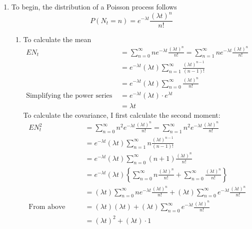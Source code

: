 \documentclass[12pt]{article}
\theoremstyle{plain}
\theoremstyle{definition}
\theoremstyle{remark}
\begin{document}
\begin{enumerate}
  \item %
    To begin, the distribution of a Poisson process follows
    \begin{equation}
      P(N_t = n) = e^{-\lambda t} \frac{(\lambda t)^n}{n!}
    \end{equation}
    \begin{enumerate}
      \item %
        To calculate the mean
        \begin{align*}
          EN_t &=
            \sum^\infty_{n=0} n e^{-\lambda t} \frac{(\lambda t)^n}{n!}
            =\sum^\infty_{n=1} n e^{-\lambda t} \frac{(\lambda t)^n}{n!}\\
          &=e^{-\lambda t} (\lambda t) \sum^\infty_{n=1}
          \frac{(\lambda t)^{n-1}}{(n-1)!}\\
          &=e^{-\lambda t} (\lambda t) \sum^\infty_{n=0}
            \frac{(\lambda t)^{n}}{n!}\\
          \text{Simplifying the power series} \qquad
          &=e^{-\lambda t} (\lambda t) \cdot e^{\lambda t}\\
          &=\lambda t
        \end{align*}
        To calculate the covariance, I first calculate the second
        moment:
        \begin{align*}
          EN_t^2 &=
            \sum^\infty_{n=0} n^2 e^{-\lambda t} \frac{(\lambda t)^n}{n!}
            =\sum^\infty_{n=1} n^2 e^{-\lambda t} \frac{(\lambda t)^n}{n!}\\
          &=e^{-\lambda t} (\lambda t) \sum^\infty_{n=1} n
          \frac{(\lambda t)^{n-1}}{(n-1)!}\\
          &=e^{-\lambda t} (\lambda t) \sum^\infty_{n=0} (n+1)
            \frac{(\lambda t)^{n}}{n!}\\
          &=e^{-\lambda t} (\lambda t) \left\{\sum^\infty_{n=0} n
            \frac{(\lambda t)^{n}}{n!} + \sum^\infty_{n=0}
            \frac{(\lambda t)^{n}}{n!}\right\}\\
          &=(\lambda t) \sum^\infty_{n=0} ne^{-\lambda t}
            \frac{(\lambda t)^{n}}{n!}
            +  (\lambda t)\sum^\infty_{n=0}e^{-\lambda t}
            \frac{(\lambda t)^{n}}{n!}\\
          \text{From above} \qquad
          &=(\lambda t)(\lambda t)
            +  (\lambda t)\sum^\infty_{n=0}e^{-\lambda t}
            \frac{(\lambda t)^{n}}{n!}\\
          &=(\lambda t)^2 + (\lambda t) \cdot 1\\

\end{align*}
\end{enumerate}
\end{enumerate}
\end{document}
